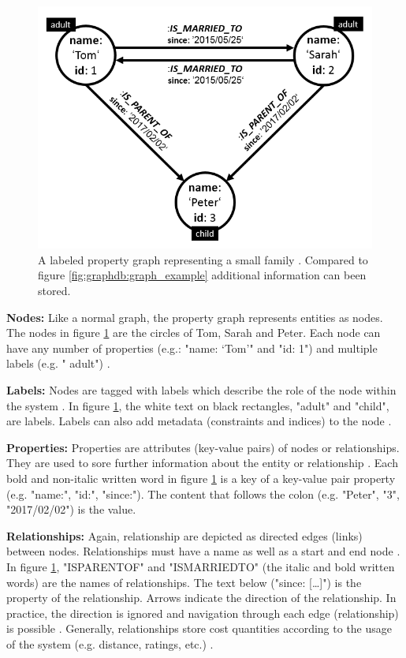 \begin{figure}[ht]
    \centering
    \includegraphics[width=.5\textwidth]{img/property_graph_example.PNG}
    \caption{A labeled property graph representing a small family \autocite{maheshlal2015, graphdb2015}. Compared to figure \ref{fig:graphdb:graph_example} additional information can been stored.}
    \label{fig:graphdb:property_graph_example}
\end{figure}


\textbf{Nodes:} Like a normal graph, the property graph represents entities as nodes. The nodes in figure \ref{fig:graphdb:property_graph_example} are the circles of Tom, Sarah and Peter. Each node can have any number of properties (e.g.: "name: ‘Tom’" and  "id: 1") and multiple labels (e.g. " adult") \autocite{neo4j:graphdb}.

\textbf{Labels:} Nodes are tagged with labels which describe the role of the node within the system \autocite{maheshlal2015}. In figure \ref{fig:graphdb:property_graph_example}, the white text on black rectangles, "adult" and "child", are labels. Labels can also add metadata (constraints and indices) to the node \autocite{maheshlal2015, neo4j:graphdb}.

\textbf{Properties:} Properties are attributes (key-value pairs) of nodes or relationships. They are used to sore further information about the entity or relationship \autocite{maheshlal2015}. Each bold and non-italic written word in figure \ref{fig:graphdb:property_graph_example} is a key of a key-value pair property (e.g. "name:", "id:", "since:"). The content that follows the colon (e.g. "Peter", "3", "2017/02/02") is the value.

\textbf{Relationships:} Again, relationship are depicted as directed edges (links) between nodes. Relationships must have a name as well as a start and end node \autocite{graphdb2015} . In figure \ref{fig:graphdb:property_graph_example}, "IS\textunderscore PARENT\textunderscore OF" and "IS\textunderscore MARRIED\textunderscore TO" (the italic and bold written words) are the names of relationships. The text below ("since: […]") is the property of the relationship. Arrows indicate the direction of the relationship.  In practice, the direction is ignored and navigation through each edge (relationship) is possible \autocite{maheshlal2015, neo4j:graphdb}. Generally, relationships store cost quantities according to the usage of the system (e.g. distance, ratings, etc.) \autocite{neo4j:graphdb}.

